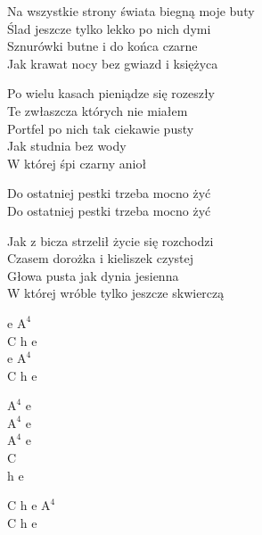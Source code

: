 \begin{text}
    Na wszystkie strony świata biegną moje buty\\
    Ślad jeszcze tylko lekko po nich dymi\\
    Sznurówki butne i do końca czarne\\
    Jak krawat nocy bez gwiazd i księżyca

    \vin Po wielu kasach pieniądze się rozeszły\\
    \vin Te zwłaszcza których nie miałem\\
    \vin Portfel po nich tak ciekawie pusty\\
    \vin Jak studnia bez wody\\
    \vin W której śpi czarny anioł

    \vin Do ostatniej pestki trzeba mocno żyć\\
    \vin Do ostatniej pestki trzeba mocno żyć

    Jak z bicza strzelił życie się rozchodzi\\
    Czasem dorożka i kieliszek czystej\\
    Głowa pusta jak dynia jesienna\\
    W której wróble tylko jeszcze skwierczą
\end{text}
\begin{chord}
    e $\mathrm{A^{4}}$\\
    C h e\\
    e $\mathrm{A^{4}}$\\
    C h e

    $\mathrm{A^{4}}$ e\\
    $\mathrm{A^{4}}$ e\\
    $\mathrm{A^{4}}$ e\\
    C\\
    h e

    C h e $\mathrm{A^{4}}$\\
    C h e
\end{chord}
